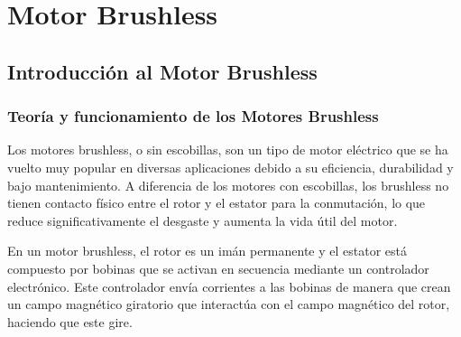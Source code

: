 \documentclass[../main]{subfiles}
\begin{document}
\chapter{Motor Brushless}
\section{Introducción al Motor Brushless}

\subsection{Teoría y funcionamiento de los Motores Brushless}

Los motores brushless, o sin escobillas, son un tipo de motor eléctrico que se ha vuelto muy popular en diversas aplicaciones debido a su eficiencia, durabilidad y bajo mantenimiento. A diferencia de los motores con escobillas, los brushless no tienen contacto físico entre el rotor y el estator para la conmutación, lo que reduce significativamente el desgaste y aumenta la vida útil del motor.


En un motor brushless, el rotor es un imán permanente y el estator está compuesto por bobinas que se activan en secuencia mediante un controlador electrónico. Este controlador envía corrientes a las bobinas de manera que crean un campo magnético giratorio que interactúa con el campo magnético del rotor, haciendo que este gire.
\end{document}
